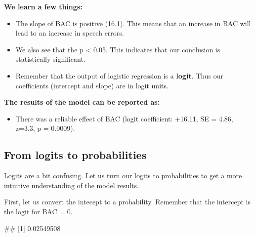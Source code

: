 \documentclass[
]{book}
\newenvironment{Shaded}{\begin{snugshade}}{\end{snugshade}}
\newcommand{\DecValTok}[1]{\textcolor[rgb]{0.00,0.00,0.81}{#1}}
\newcommand{\FunctionTok}[1]{\textcolor[rgb]{0.13,0.29,0.53}{\textbf{#1}}}
\newcommand{\NormalTok}[1]{#1}
\newcommand{\OtherTok}[1]{\textcolor[rgb]{0.56,0.35,0.01}{#1}}
\newcommand{\SpecialCharTok}[1]{\textcolor[rgb]{0.81,0.36,0.00}{\textbf{#1}}}
\providecommand{\tightlist}{%
  \setlength{\itemsep}{0pt}\setlength{\parskip}{0pt}}
\begin{document}
\textbf{We learn a few things:}

\begin{itemize}
\tightlist
\item
  The slope of BAC is positive (16.1). This means that an increase in BAC will lead to an increase in speech errors.
\item
  We also see that the p \textless{} 0.05. This indicates that our conclusion is statistically significant.
\item
  Remember that the output of logistic regression is a \textbf{logit}. Thus our coefficients (intercept and slope) are in logit units.
\end{itemize}

\textbf{The results of the model can be reported as:}

\begin{itemize}
\tightlist
\item
  There was a reliable effect of BAC (logit coefficient: +16.11, SE = 4.86, z=3.3, p = 0.0009).
\end{itemize}

\subsection{From logits to probabilities}\label{from-logits-to-probabilities}

Logits are a bit confusing. Let us turn our logits to probabilities to get a more intuitive understanding of the model results.

First, let us convert the intecept to a probability. Remember that the intercept is the logit for BAC = 0.

\begin{Shaded}
\end{Shaded}

\begin{Shaded}
\begin{Highlighting}[]
\NormalTok{\#\# [1] 0.02549508}
\end{Highlighting}
\end{Shaded}
\end{document}

